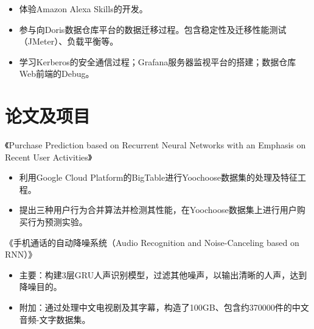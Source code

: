 \documentclass{resume}
\begin{document}
\begin{itemize}
  \item 体验Amazon Alexa Skills的开发。
\end{itemize}

\begin{itemize}
  \item 参与向Doris数据仓库平台的数据迁移过程。包含稳定性及迁移性能测试（JMeter）、负载平衡等。
  \item 学习Kerberos的安全通信过程；Grafana服务器监视平台的搭建；数据仓库Web前端的Debug。
\end{itemize}


\section{论文及项目}
《Purchase Prediction based on Recurrent Neural Networks with an Emphasis on Recent User Activities》
\begin{itemize}
  \item 利用Google Cloud Platform的BigTable进行Yoochoose数据集的处理及特征工程。
  \item 提出三种用户行为合并算法并检测其性能，在Yoochoose数据集上进行用户购买行为预测实验。
\end{itemize}

《手机通话的自动降噪系统（Audio Recognition and Noise-Canceling based on RNN）》
\begin{itemize}
  \item 主要：构建3层GRU人声识别模型，过滤其他噪声，以输出清晰的人声，达到降噪目的。
  \item 附加：通过处理中文电视剧及其字幕，构造了100GB、包含约370000件的中文音频-文字数据集。
\end{itemize}
\end{document}
